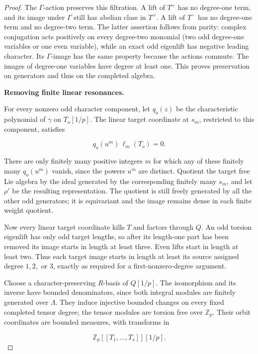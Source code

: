 \documentclass[11pt,a4paper]{article}
\theoremstyle{definition}
\begin{document}
\begin{proof}
The \(\Gamma\)-action preserves this filtration. A lift of \(T^+\) has no degree-one term, and its image under \(\Gamma\) still has abelian class in \(T^+\). A lift of \(T^-\) has no degree-one term and no degree-two term. The latter assertion follows from parity: complex conjugation acts positively on every degree-two monomial (two odd degree-one variables or one even variable), while an exact odd eigenlift has negative leading character. Its \(\Gamma\)-image has the same property because the actions commute. The images of degree-one variables have degree at least one. This proves preservation on generators and thus on the completed algebra.

\par\medskip\noindent\textbf{Removing finite linear resonances.}

For every nonzero odd character component, let \(q_o(z)\) be the characteristic polynomial of \(\gamma\) on \(T_o[1/p]\). The linear target coordinate at \(s_m\), restricted to this component, satisfies

\[
q_o(u^m)\,\ell_m(T_o)=0.
\]

There are only finitely many positive integers \(m\) for which any of these finitely many \(q_o(u^m)\) vanish, since the powers \(u^m\) are distinct. Quotient the target free Lie algebra by the ideal generated by the corresponding finitely many \(s_m\), and let \(\rho'\) be the resulting representation. The quotient is still freely generated by all the other odd generators; it is equivariant and the image remains dense in each finite weight quotient.

Now every linear target coordinate kills \(T\) and factors through \(Q\). An odd torsion eigenlift has only odd target lengths, so after its length-one part has been removed its image starts in length at least three. Even lifts start in length at least two. Thus each target image starts in length at least its source assigned degree \(1,2,\) or \(3\), exactly as required for a first-nonzero-degree argument.

Choose a character-preserving \(R\)-basis of \(Q[1/p]\). The isomorphism and its inverse have bounded denominators, since both integral modules are finitely generated over \(\Lambda\). They induce injective bounded changes on every fixed completed tensor degree; the tensor modules are torsion free over \(\mathbb Z_p\). Their orbit coordinates are bounded measures, with transforms in

\[
\mathbb Z_p[[T_1,\ldots,T_s]][1/p].
\]


\end{proof}
\end{document}
